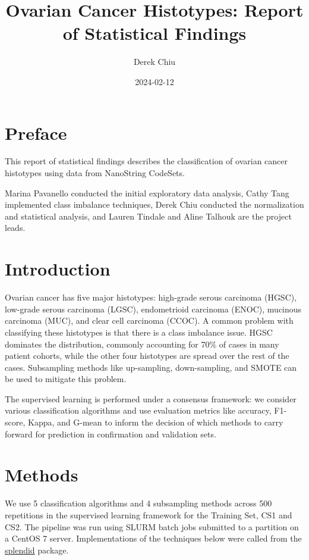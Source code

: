 \documentclass[
]{report}
\title{Ovarian Cancer Histotypes: Report of Statistical Findings}
\author{Derek Chiu}
\date{2024-02-12}
\begin{document}
\maketitle

{
\hypersetup{linkcolor=}
\setcounter{tocdepth}{1}
\tableofcontents
}
\listoffigures
\listoftables
\hypertarget{preface}{%
\chapter*{Preface}\label{preface}}

This report of statistical findings describes the classification of ovarian cancer histotypes using data from NanoString CodeSets.

Marina Pavanello conducted the initial exploratory data analysis, Cathy Tang implemented class imbalance techniques, Derek Chiu conducted the normalization and statistical analysis, and Lauren Tindale and Aline Talhouk are the project leads.

\hypertarget{introduction}{%
\chapter{Introduction}\label{introduction}}

Ovarian cancer has five major histotypes: high-grade serous carcinoma (HGSC), low-grade serous carcinoma (LGSC), endometrioid carcinoma (ENOC), mucinous carcinoma (MUC), and clear cell carcinoma (CCOC). A common problem with classifying these histotypes is that there is a class imbalance issue. HGSC dominates the distribution, commonly accounting for 70\% of cases in many patient cohorts, while the other four histotypes are spread over the rest of the cases. Subsampling methods like up-sampling, down-sampling, and SMOTE can be used to mitigate this problem.

The supervised learning is performed under a consensus framework: we consider various classification algorithms and use evaluation metrics like accuracy, F1-score, Kappa, and G-mean to inform the decision of which methods to carry forward for prediction in confirmation and validation sets.

\hypertarget{methods}{%
\chapter{Methods}\label{methods}}

We use 5 classification algorithms and 4 subsampling methods across 500 repetitions in the supervised learning framework for the Training Set, CS1 and CS2. The pipeline was run using SLURM batch jobs submitted to a partition on a CentOS 7 server. Implementations of the techniques below were called from the \href{https://alinetalhouk.github.io/splendid/}{splendid} package.
\end{document}
